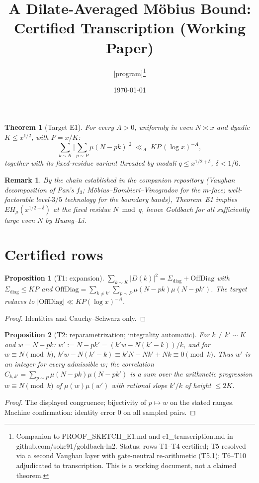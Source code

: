 \documentclass[11pt]{article}
\title{A Dilate-Averaged M\"obius Bound:\\ Certified Transcription (Working Paper)}
\author{[program]\thanks{Companion to PROOF\_SKETCH\_E1.md and
e1\_transcription.md in github.com/soke91/goldbach-ln2. Status: rows
T1--T4 certified; T5 resolved via a second Vaughan layer with
gate-neutral re-arithmetic (T5.1); T6--T10 adjudicated to transcription.
This is a working document, not a claimed theorem.}}
\date{\today}
\newtheorem{theorem}{Theorem}
\newtheorem{proposition}{Proposition}
\newtheorem{remark}{Remark}
\begin{document}
\maketitle

\begin{theorem}[Target E1]
For every $A>0$, uniformly in even $N \asymp x$ and dyadic
$K \le x^{1/2}$, with $P = x/K$:
\[
\sum_{k\sim K}\Big|\sum_{p\sim P}\mu(N-pk)\Big|^2
\;\ll_A\; K P\,(\log x)^{-A},
\]
together with its fixed-residue variant threaded by moduli
$q \le x^{1/2+\delta}$, $\delta < 1/6$.
\end{theorem}

\begin{remark}
By the chain established in the companion repository (Vaughan
decomposition of Pan's $f_3$; M\"obius--Bombieri--Vinogradov for the
$m$-face; well-factorable level-$3/5$ technology for the boundary
bands), Theorem~E1 implies $EH_\mu(x^{1/2+\delta})$ at the fixed
residue $N \bmod q$, hence Goldbach for all sufficiently large even
$N$ by Huang--Li.
\end{remark}

\section{Certified rows}

\begin{proposition}[T1: expansion]
$\sum_{k\sim K}|D(k)|^2 = \Sigma_{\mathrm{diag}} + \mathrm{OffDiag}$
with $\Sigma_{\mathrm{diag}} \le KP$ and
$\mathrm{OffDiag}=\sum_{k\ne k'}\sum_{p\sim P}\mu(N-pk)\mu(N-pk')$.
The target reduces to $|\mathrm{OffDiag}| \ll KP(\log x)^{-A}$.
\end{proposition}
\begin{proof} Identities and Cauchy--Schwarz only. \end{proof}

\begin{proposition}[T2: reparametrization; integrality automatic]
For $k \ne k' \sim K$ and $w = N - pk$:
$w' := N - pk' = (k'w - N(k'-k))/k$, and for $w \equiv N \pmod k$,
$k'w - N(k'-k) \equiv k'N - Nk' + Nk \equiv 0 \pmod k$.
Thus $w'$ is an integer for every admissible $w$; the correlation
$C_{k,k'} = \sum_{p\sim P}\mu(N-pk)\mu(N-pk')$ is a sum over the
arithmetic progression $w \equiv N \pmod k$ of
$\mu(w)\mu(w')$ with rational slope $k'/k$ of height $\le 2K$.
\end{proposition}
\begin{proof} The displayed congruence; bijectivity of $p \mapsto w$ on
the stated ranges. Machine confirmation: identity error $0$ on all
sampled pairs. \end{proof}
\end{document}
